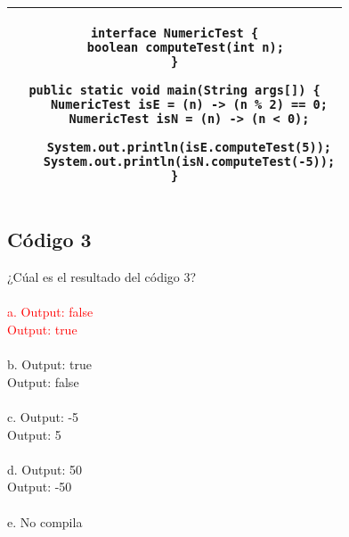 \documentclass[spanish,english]{article}
\begin{document}
\item[\hspace*{1cm} \hspace*{1cm}
\hspace*{1cm} \hspace*{1cm}]
\begin{tabular}{|c|}
\hline 
\begin{lstlisting}
interface NumericTest {
	boolean computeTest(int n); 
}

public static void main(String args[]) {
	NumericTest isE = (n) -> (n % 2) == 0;
	NumericTest isN = (n) -> (n < 0);

	System.out.println(isE.computeTest(5));
	System.out.println(isN.computeTest(-5));
}
\end{lstlisting}
\hspace*{1cm} \hspace*{1cm} \hspace*{1cm} \hspace*{1cm} \tabularnewline
\hline 
\end{tabular}

\subsection{Código 3}

¿Cúal es el resultado del código 3?\\\\
\textcolor{red}{a. Output: false\\
   Output: true}\\\\
b. Output: true\\
   Output: false\\\\
c. Output: -5\\
   Output: 5\\ \\
d. Output: 50\\
   Output: -50\\ \\
e. No compila\\
\end{document}
